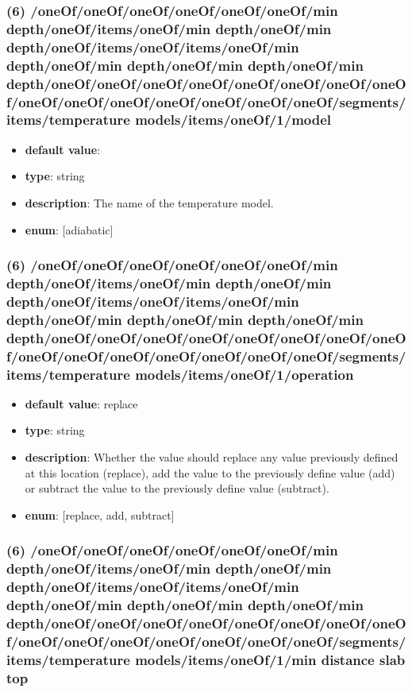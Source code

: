 \subsubsection{(6) /oneOf/oneOf/oneOf/oneOf/oneOf/oneOf/min depth/oneOf/items/oneOf/min depth/oneOf/min depth/oneOf/items/oneOf/items/oneOf/min depth/oneOf/min depth/oneOf/min depth/oneOf/min depth/oneOf/oneOf/oneOf/oneOf/oneOf/oneOf/oneOf/oneOf/oneOf/oneOf/oneOf/oneOf/oneOf/oneOf/oneOf/segments/items/temperature models/items/oneOf/1/model}
\begin{itemize}[leftmargin=6em]\item {\bf default value}: 
\item {\bf type}: string
\item {\bf description}: The name of the temperature model.
\item {\bf enum}: [adiabatic]\end{itemize}\subsubsection{(6) /oneOf/oneOf/oneOf/oneOf/oneOf/oneOf/min depth/oneOf/items/oneOf/min depth/oneOf/min depth/oneOf/items/oneOf/items/oneOf/min depth/oneOf/min depth/oneOf/min depth/oneOf/min depth/oneOf/oneOf/oneOf/oneOf/oneOf/oneOf/oneOf/oneOf/oneOf/oneOf/oneOf/oneOf/oneOf/oneOf/oneOf/segments/items/temperature models/items/oneOf/1/operation}
\begin{itemize}[leftmargin=6em]\item {\bf default value}: replace
\item {\bf type}: string
\item {\bf description}: Whether the value should replace any value previously defined at this location (replace), add the value to the previously define value (add) or subtract the value to the previously define value (subtract).
\item {\bf enum}: [replace, add, subtract]\end{itemize}\subsubsection{(6) /oneOf/oneOf/oneOf/oneOf/oneOf/oneOf/min depth/oneOf/items/oneOf/min depth/oneOf/min depth/oneOf/items/oneOf/items/oneOf/min depth/oneOf/min depth/oneOf/min depth/oneOf/min depth/oneOf/oneOf/oneOf/oneOf/oneOf/oneOf/oneOf/oneOf/oneOf/oneOf/oneOf/oneOf/oneOf/oneOf/oneOf/segments/items/temperature models/items/oneOf/1/min distance slab top}
